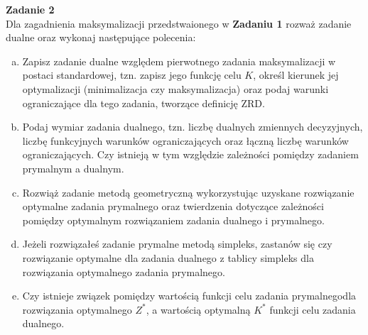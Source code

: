 \documentclass[11pt]{article}
\begin{document}
\textbf{Zadanie 2}\\
Dla zagadnienia maksymalizacji przedstwaionego w \textbf{Zadaniu 1} rozważ zadanie dualne oraz wykonaj następujące polecenia: 
\begin{enumerate}[a)]
\item Zapisz zadanie dualne względem pierwotnego zadania maksymalizacji w postaci standardowej, tzn. zapisz jego funkcję celu $K$, określ kierunek jej optymalizacji (minimalizacja czy maksymalizacja) oraz podaj warunki ograniczające dla tego zadania, tworzące definicję ZRD. 
\item Podaj wymiar zadania dualnego, tzn. liczbę dualnych zmiennych decyzyjnych, liczbę funkcyjnych warunków ograniczających oraz łączną liczbę warunków ograniczających. Czy istnieją w tym względzie zależności pomiędzy zadaniem prymalnym a dualnym.
\item Rozwiąż zadanie metodą geometryczną wykorzystując uzyskane rozwiązanie optymalne zadania prymalnego oraz twierdzenia dotyczące zależności pomiędzy optymalnym rozwiązaniem zadania dualnego i prymalnego.
\item Jeżeli rozwiązałeś zadanie prymalne metodą simpleks, zastanów się czy rozwiązanie optymalne dla zadania dualnego z tablicy simpleks dla rozwiązania optymalnego zadania prymalnego.
\item Czy istnieje związek pomiędzy wartością funkcji celu zadania prymalnegodla rozwiązania optymalnego $Z^\ast$, a wartością optymalną $K^\ast$ funkcji celu zadania dualnego. 
\end{enumerate}
\end{document}

